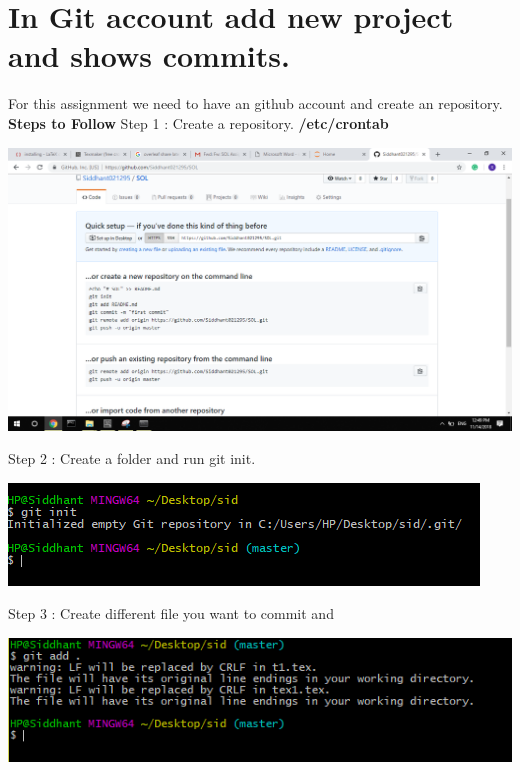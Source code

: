 \documentclass{article}
\begin{document}
\section{In Git account add new project and shows commits.}
For this assignment we need to have an github account and create an repository.
\newline
\newline
\textbf{Steps to Follow}
\newline
Step 1 : Create a repository. \textbf{/etc/crontab}\newline
\begin{center}
    \includegraphics[scale=0.2]{git1.png}
\end{center}
Step 2 : Create a folder and run git init.\newline
\begin{center}
    \includegraphics[scale=1]{git2.png}
\end{center}
Step 3 : Create different file you want to commit and \newline
\begin{center}
    \includegraphics[scale=1]{git3.png}
\end{center}
\end{document}
